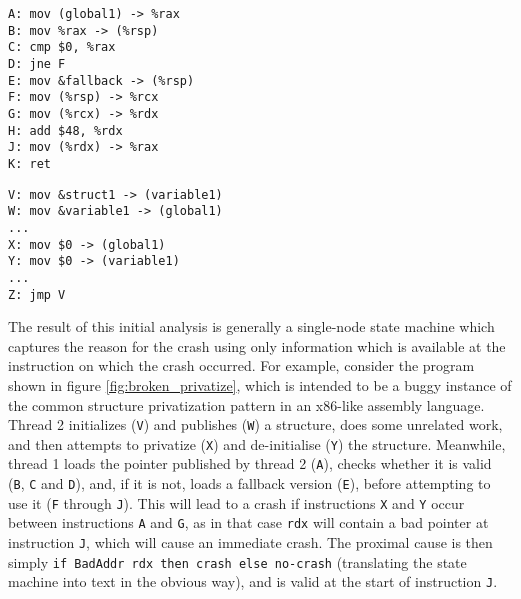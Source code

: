 \documentclass[10pt,twocolumn,preprint,natbib,authoryear]{sigplanconf}
\makeatletter
\newcommand{\editorial}[1]{}
\newcommand{\needCite}{\editorial{need cite}}
\newenvironment{subfloat}%
    {\def\caption##1{\gdef\subcapsave{\relax##1}}%
     \let\subcapsave=\@empty %
     \let\sf@oldlabel=\label
     \def\label##1{\xdef\sublabsave{\noexpand\label{##1}}}%
     \let\sublabsave\relax    %
     \setbox\subfigbox\hbox
       \bgroup}%
      {\egroup                %
     \let\label=\sf@oldlabel
     \subfigure[\subcapsave]{\box\subfigbox}}%
\makeatother
\begin{document}
\begin{figure*}
 \begin{subfloat}
  \begin{minipage}{90mm}
\begin{verbatim}
A: mov (global1) -> %rax
B: mov %rax -> (%rsp)
C: cmp $0, %rax
D: jne F
E: mov &fallback -> (%rsp)
F: mov (%rsp) -> %rcx
G: mov (%rcx) -> %rdx
H: add $48, %rdx
J: mov (%rdx) -> %rax
K: ret
\end{verbatim}
  \end{minipage}
  \caption{Thread 1}
 \end{subfloat}
 \begin{subfloat}
  \begin{minipage}{90mm}
\begin{verbatim}
V: mov &struct1 -> (variable1)
W: mov &variable1 -> (global1)
...
X: mov $0 -> (global1)
Y: mov $0 -> (variable1)
...
Z: jmp V
\end{verbatim}
  \end{minipage}
  \caption{Thread 2}
 \end{subfloat}
 \caption{A buggy example of the privatize synchronization pattern.}
 \label{fig:broken_privatize}
\end{figure*}

The result of this initial analysis is generally a single-node state
machine which captures the reason for the crash using only information
which is available at the instruction on which the crash occurred.
For example, consider the program shown in figure
\ref{fig:broken_privatize}, which is intended to be a buggy instance
of the common structure privatization pattern\needCite{} in an
x86-like assembly language.  Thread 2 initializes (\verb|V|) and
publishes (\verb|W|) a structure, does some unrelated work, and then
attempts to privatize (\verb|X|) and de-initialise (\verb|Y|) the
structure.  Meanwhile, thread 1 loads the pointer published by thread
2 (\verb|A|), checks whether it is valid (\verb|B|, \verb|C| and
\verb|D|), and, if it is not, loads a fallback version (\verb|E|),
before attempting to use it (\verb|F| through \verb|J|).  This will
lead to a crash if instructions \verb|X| and \verb|Y| occur between
instructions \verb|A| and \verb|G|, as in that case \verb|rdx| will
contain a bad pointer at instruction \verb|J|, which will cause an
immediate crash.  The proximal cause is then simply
\verb|if BadAddr rdx then crash else no-crash| (translating the state
machine into text in the obvious way), and is valid at the start of
instruction \verb|J|.
\end{document}
